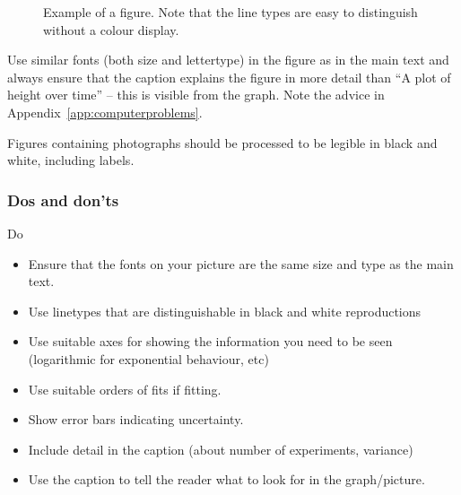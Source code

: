 \documentclass[a5paper, 10pt]{article}
\begin{document}
\begin{figure}[htbp]
  \centering
  \caption{Example of a figure.  Note that the line types are easy to
    distinguish without a colour display.  }
  \label{fig:figexample}
\end{figure}

Use similar fonts (both size and lettertype) in the figure as in the
main text and always ensure that the caption explains the figure in
more detail than ``A plot of height over time'' -- this is visible from the
graph.  Note the advice in Appendix~\ref{app:computerproblems}.

Figures containing photographs should be processed to be legible in
black and white, including labels.

\subsubsection*{Dos and don'ts}
Do
\begin{itemize}
\item Ensure that the fonts on your picture are the same size and type as
  the main text.
\item Use linetypes that are distinguishable in black and white
  reproductions
\item Use suitable axes for showing the information you need to be seen
  (logarithmic for exponential behaviour, etc)
\item Use suitable orders of fits if fitting.
\item Show error bars indicating uncertainty.
\item Include detail in the caption (about number of experiments,
  variance)
\item Use the caption to tell the reader what to look for in the graph/picture.
\end{itemize}
\end{document}

